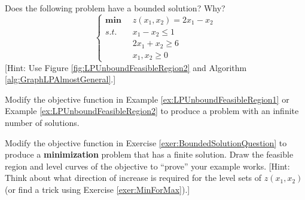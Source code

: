 \begin{exercise} Does the following problem have a bounded solution? Why?
\begin{equation}
\left\{
\begin{aligned}
\boldsymbol{\min}\;\;& z(x_1,x_2) = 2x_1 - x_2\\
s.t.\;\;& x_1 - x_2 \leq 1\\
& 2x_1 + x_2 \geq 6\\
&x_1,x_2 \geq 0
\end{aligned}
\right.
\end{equation}
[Hint: Use Figure \ref{fig:LPUnboundFeasibleRegion2} and Algorithm \ref{alg:GraphLPAlmostGeneral}.]
\label{exer:BoundedSolutionQuestion}
\end{exercise}

\begin{exercise} Modify the objective function in Example \ref{ex:LPUnboundFeasibleRegion1} or Example \ref{ex:LPUnboundFeasibleRegion2} to produce a problem with an infinite number of solutions. 
\end{exercise}

\begin{exercise} Modify the objective function in Exercise \ref{exer:BoundedSolutionQuestion} to produce a \textbf{minimization} problem that has a finite solution. Draw the feasible region and level curves of the objective to ``prove'' your example works. [Hint: Think about what direction of increase is required for the level sets of $z(x_1,x_2)$ (or find a trick using Exercise \ref{exer:MinForMax}).]
\end{exercise}

